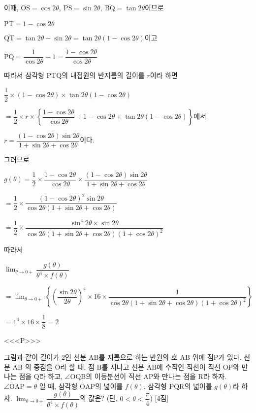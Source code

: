 \documentclass{oblivoir}
\begin{document}
이때, $\overline{\mathrm{OS}}=\cos 2\theta ,\:\overline{\mathrm{PS}}=\sin 2\theta ,\:\overline{\mathrm{BQ}}=\tan 2\theta$이므로

$\overline{\mathrm{PT}}=1-\cos 2\theta$

$\overline{\mathrm{QT}}=\tan 2\theta -\sin 2\theta =\tan 2\theta(1 -\cos 2\theta)$이고 

$\overline{\mathrm{PQ}}=\dfrac{1}{\cos 2\theta}-1=\dfrac{1-\cos 2\theta}{\cos 2\theta}$

따라서 삼각형 $\mathrm{PTQ}$의 내접원의 반지름의 길이를 $r$이라 하면 

$\dfrac{1}{2}\times(1-\cos 2\theta)\times\tan 2\theta(1-\cos 2\theta)$

$=\dfrac{1}{2}\times r\times\left\{\dfrac{1-\cos 2\theta}{\cos 2\theta}+1-\cos 2\theta +\tan 2\theta(1-\cos 2\theta)\right\}$에서

$r =\dfrac{(1-\cos 2\theta)\sin 2\theta}{1+\sin 2\theta +\cos 2\theta}$이다. 

그러므로

$g(\theta)=\dfrac{1}{2}\times\dfrac{1-\cos 2\theta}{\cos 2\theta}\times\dfrac{(1-\cos 2\theta)\sin 2\theta}{1+\sin 2\theta +\cos 2\theta}$

$=\dfrac{1}{2}\times\dfrac{(1-\cos 2\theta)^{2}\sin 2\theta}{\cos 2\theta(1+\sin 2\theta +\cos 2\theta)}$

$=\dfrac{1}{2}\times\dfrac{\sin^{4}2\theta\times\sin 2\theta}{\cos 2\theta(1+\sin 2\theta +\cos 2\theta)(1+\cos 2\theta)^{2}}$

따라서

$\displaystyle\lim_{\theta\rightarrow 0+}\dfrac{g(\theta)}{\theta^{4}\times f(\theta)}$

$ =\displaystyle\lim_{\theta\rightarrow 0+}\left\{\left(\dfrac{\sin 2\theta}{2\theta}\right)^{4}\times 16\times\dfrac{1}{\cos 2\theta(1+\sin 2\theta +\cos 2\theta)(1+\cos 2\theta)^{2}}\right\}$

$=1^{4}\times 16\times\dfrac{1}{8}=2$

<<<P>>>

그림과 같이 길이가 $2$인 선분 $\mathrm{AB}$를 지름으로 하는 반원의 호 $\mathrm{AB}$ 위에 점$\mathrm{P}$가 있다. 선분 $\mathrm{AB}$ 의 중점을 $\mathrm{O}$라 할 때, 점 $\mathrm{B}$를 지나고 선분 $\mathrm{AB}$에 수직인 직선이 직선 $\mathrm{OP}$와 만나는 점을 $\mathrm{Q}$라 하고, $\angle\mathrm{OQB}$의 이등분선이 직선 $\mathrm{AP}$와 만나는 점을 $\mathrm{R}$라 하자. $\angle\mathrm{OAP}=\theta$ 일 때, 삼각형 $\mathrm{OAP}$의 넓이를 $f(\theta)$,  삼각형 $\mathrm{PQR}$의 넓이를 $g(\theta)$라 하자. $\displaystyle\lim_{\theta\rightarrow 0+}\dfrac{g(\theta)}{\theta^{4}\times f(\theta)}$의 값은? (단, $0< \theta < \dfrac{\pi}{4}$) [4점]
\end{document}
